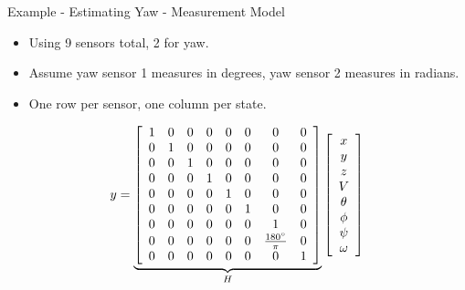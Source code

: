 \documentclass[hyperref={pdfpagelabels=false}]{beamer}
\begin{document}
\begin{frame}{Example - Estimating Yaw - Measurement Model}
\begin{itemize}
\item Using 9 sensors total, 2 for yaw.
\item Assume yaw sensor 1 measures in degrees, yaw sensor 2 measures in radians.
\item One row per sensor, one column per state.
\end{itemize}
\begin{align*}
y = \underbrace{\left[\begin{array}{c c c c c c c c}
1 & 0 & 0 & 0 & 0 & 0 & 0 & 0 \\
0 & 1 & 0 & 0 & 0 & 0 & 0 & 0 \\
0 & 0 & 1 & 0 & 0 & 0 & 0 & 0 \\
0 & 0 & 0 & 1 & 0 & 0 & 0 & 0 \\
0 & 0 & 0 & 0 & 1 & 0 & 0 & 0 \\
0 & 0 & 0 & 0 & 0 & 1 & 0 & 0 \\
0 & 0 & 0 & 0 & 0 & 0 & 1 & 0 \\
0 & 0 & 0 & 0 & 0 & 0 & \frac{180^\circ}{\pi} & 0 \\
0 & 0 & 0 & 0 & 0 & 0 & 0 & 1
\end{array}\right]}_{H}
\left[\begin{array}{c}
x \\ y \\ z \\ V \\ \theta \\ \phi \\ \psi \\ \omega
\end{array}\right]
\end{align*}
\end{frame}
\end{document}

